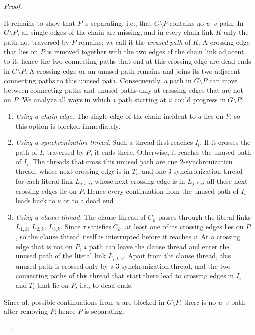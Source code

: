 \begin{proof}
\begin{enumerate}[(a)]
It remains to show that $P$ is separating, i.e., that $G\setminus P$ contains no $u$--$v$ path.
In $G \setminus P$, all single edges of the chain are missing, and in every chain link $K$ only the path not traversed by $P$ remains; we call it the \emph{unused path} of $K$.
A crossing edge that lies on $P$ is removed together with the two edges of the chain link adjacent to it; hence the two connecting paths that end at this crossing edge are dead ends in $G \setminus P$.
A crossing edge on an unused path remains and joins its two adjacent connecting paths to this unused path.
Consequently, a path in $G \setminus P$ can move between connecting paths and unused paths only at crossing edges that are not on $P$.
We analyze all ways in which a path starting at $u$ could progress in $G \setminus P$:
\begin{enumerate}
  \item \emph{Using a chain edge.} The single edge of the chain incident to $u$ lies on $P$, so this option is blocked immediately.
  \item \emph{Using a synchronization thread.} Such a thread first reaches $I_i$.
  If it crosses the path of $I_i$ traversed by $P$, it ends there.
  Otherwise, it reaches the unused path of $I_i$.
  The threads that cross this unused path are one 2-synchronization thread, whose next crossing edge is in $T_i$, and one 3-synchronization thread for each literal link $L_{j,k,i}$, whose next crossing edge is in $L_{j,k,i}$; all these next crossing edges lie on $P$.
  Hence every continuation from the unused path of $I_i$ leads back to $u$ or to a dead end.
  \item \emph{Using a clause thread.} The clause thread of $C_k$ passes through the literal links $L_{1,k}$, $L_{2,k}$, $L_{3,k}$.
  Since $\tau$ satisfies $C_k$, at least one of its crossing edges lies on $P$, so the clause thread itself is interrupted before it reaches $v$.
  At a crossing edge that is not on $P$, a path can leave the clause thread and enter the unused path of the literal link $L_{j,k,i}$.
  Apart from the clause thread, this unused path is crossed only by a 3-synchronization thread, and the two connecting paths of this thread that start there lead to crossing edges in $I_i$ and $T_i$ that lie on $P$, i.e., to dead ends.
\end{enumerate}
Since all possible continuations from $u$ are blocked in $G\setminus P$, there is no $u$--$v$ path after removing $P$; hence $P$ is separating.
\end{enumerate}


\end{proof}

